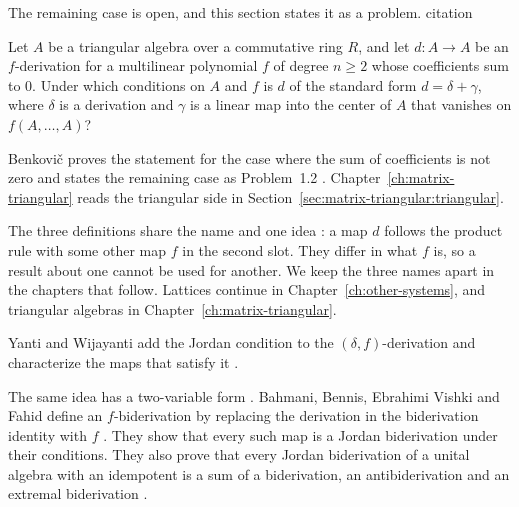The remaining case is open, and this section states it as a problem.
citation

\begin{problem}\label{prob:open:fderiv}
Let $A$ be a triangular algebra over a commutative ring $R$, and let $d\colon
A\to A$ be an $f$-derivation for a multilinear polynomial $f$ of degree $n\ge2$
whose coefficients sum to $0$.
Under which conditions on $A$ and $f$ is $d$ of the standard form
$d=\delta+\gamma$, where $\delta$ is a derivation and $\gamma$ is a linear map
into the center of $A$ that vanishes on $f(A,\dots,A)$?
\end{problem}

Benkovi\v{c} proves the statement for the case where the sum of coefficients
is not zero \cite[Theorem~1.1]{Benkovic2014} and states the remaining case as
Problem~1.2 \cite[Problem~1.2]{Benkovic2014}.
Chapter~\ref{ch:matrix-triangular} reads the triangular side in
Section~\ref{sec:matrix-triangular:triangular}.

The three definitions share the name and one idea
\cite[Definition~8, p.~702]{CevenOzturk2008}: a map $d$ follows the product
rule with some other map $f$ in the second slot. They differ in what
$f$ is, so a result about one cannot be used for another. We keep the three
names apart in the chapters that follow. Lattices continue in
Chapter~\ref{ch:other-systems}, and triangular algebras in
Chapter~\ref{ch:matrix-triangular}.

Yanti and Wijayanti add the Jordan condition to the $(\delta,f)$-derivation
and characterize the maps that satisfy it
\cite[Abstract, p.~1]{YantiWijayanti2025}.

The same idea has a two-variable form
\cite[Theorem~2.7, p.~12]{BahmaniBennisEbrahimiFahid2021Bideriv}. Bahmani, Bennis,
Ebrahimi Vishki and Fahid define an $f$-biderivation by replacing the
derivation in the biderivation identity with $f$
\cite[Theorem~2.7, p.~12]{BahmaniBennisEbrahimiFahid2021Bideriv}. They show that
every such map is a Jordan biderivation under their conditions. They also
prove that every Jordan biderivation of a unital algebra with an idempotent is
a sum of a biderivation, an antibiderivation and an extremal biderivation
\cite[Theorem~2.7, p.~12]{BahmaniBennisEbrahimiFahid2021Bideriv}.
